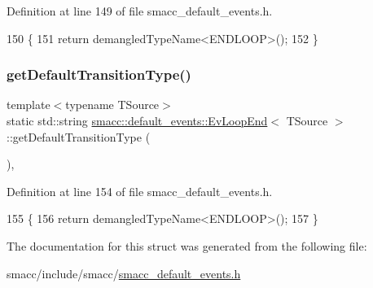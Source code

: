 Definition at line 149 of file smacc\+\_\+default\+\_\+events.\+h.


\begin{DoxyCode}
150   \{
151     \textcolor{keywordflow}{return} demangledTypeName<ENDLOOP>();
152   \}
\end{DoxyCode}
\mbox{\label{structsmacc_1_1default__events_1_1EvLoopEnd_a9e05a6de331e6926fdcaa1ef13a6bd3c}} 
\subsubsection{\texorpdfstring{get\+Default\+Transition\+Type()}{getDefaultTransitionType()}}
{\footnotesize\ttfamily template$<$typename T\+Source$>$ \\
static std\+::string \hyperlink{structsmacc_1_1default__events_1_1EvLoopEnd}{smacc\+::default\+\_\+events\+::\+Ev\+Loop\+End}$<$ T\+Source $>$\+::get\+Default\+Transition\+Type (\begin{DoxyParamCaption}{ }\end{DoxyParamCaption})\hspace{0.3cm}{\ttfamily [inline]}, {\ttfamily [static]}}



Definition at line 154 of file smacc\+\_\+default\+\_\+events.\+h.


\begin{DoxyCode}
155   \{
156     \textcolor{keywordflow}{return} demangledTypeName<ENDLOOP>();
157   \}
\end{DoxyCode}


The documentation for this struct was generated from the following file\+:\begin{DoxyCompactItemize}
\item 
smacc/include/smacc/\hyperlink{smacc__default__events_8h}{smacc\+\_\+default\+\_\+events.\+h}\end{DoxyCompactItemize}
